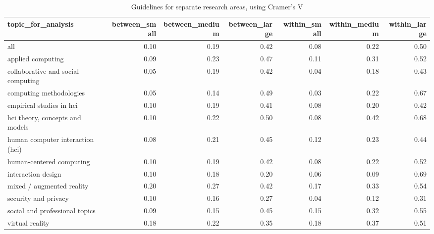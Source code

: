 \begin{table}[ht]
\centering
\begin{tabular}{lrrrrrr}
  \hline
topic\_for\_analysis & between\_small & between\_medium & between\_large & within\_small & within\_medium & within\_large \\ 
  \hline
all & 0.10 & 0.19 & 0.42 & 0.08 & 0.22 & 0.50 \\ 
  applied computing & 0.09 & 0.23 & 0.47 & 0.11 & 0.31 & 0.52 \\ 
  collaborative and social computing & 0.05 & 0.19 & 0.42 & 0.04 & 0.18 & 0.43 \\ 
  computing methodologies & 0.05 & 0.14 & 0.49 & 0.03 & 0.22 & 0.67 \\ 
  empirical studies in hci & 0.10 & 0.19 & 0.41 & 0.08 & 0.20 & 0.42 \\ 
  hci theory, concepts and models & 0.10 & 0.22 & 0.50 & 0.08 & 0.42 & 0.68 \\ 
  human computer interaction (hci) & 0.08 & 0.21 & 0.45 & 0.12 & 0.23 & 0.44 \\ 
  human-centered computing & 0.10 & 0.19 & 0.42 & 0.08 & 0.22 & 0.52 \\ 
  interaction design & 0.10 & 0.18 & 0.20 & 0.06 & 0.09 & 0.69 \\ 
  mixed / augmented reality & 0.20 & 0.27 & 0.42 & 0.17 & 0.33 & 0.54 \\ 
  security and privacy & 0.10 & 0.16 & 0.27 & 0.04 & 0.12 & 0.31 \\ 
  social and professional topics & 0.09 & 0.15 & 0.45 & 0.15 & 0.32 & 0.55 \\ 
  virtual reality & 0.18 & 0.22 & 0.35 & 0.18 & 0.37 & 0.51 \\ 
   \hline
\end{tabular}
\caption{Guidelines for separate research areas, using Cramer's V} 
\label{tab:es guidelines cramersv-es different topics}
\end{table}


